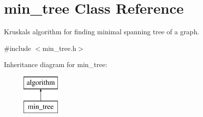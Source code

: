 \hypertarget{classmin__tree}{}\section{min\+\_\+tree Class Reference}
\label{classmin__tree}


Kruskal\textquotesingle{}s algorithm for finding minimal spanning tree of a graph.  




{\ttfamily \#include $<$min\+\_\+tree.\+h$>$}

Inheritance diagram for min\+\_\+tree\+:\begin{figure}[H]
\begin{center}
\leavevmode
\includegraphics[height=2.000000cm]{classmin__tree}
\end{center}
\end{figure}
